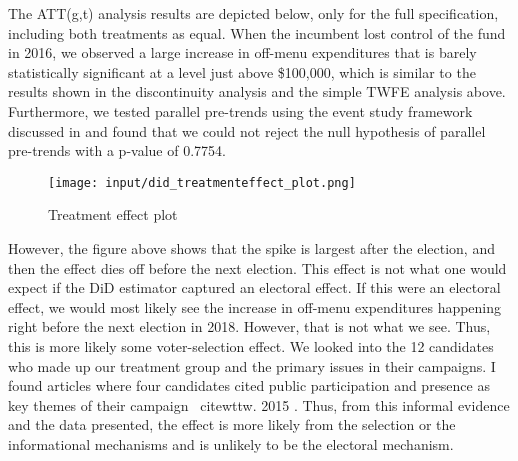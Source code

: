 The ATT(g,t) analysis results are depicted below, only for the full specification, including both treatments as equal. 
When the incumbent lost control of the fund in 2016, we observed a large increase in off-menu expenditures that is barely statistically significant at a level just above \$100,000, which is similar to the results shown in the discontinuity analysis and the simple TWFE analysis above. 
Furthermore, we tested parallel pre-trends using the event study framework discussed in \cite{CALLAWAY2021200} and found that we could not reject the null hypothesis of parallel pre-trends with a p-value of 0.7754. 

\begin{figure}[H]
    \centering
    \texttt{[image: input/did\_treatmenteffect\_plot.png]}
    \caption{Treatment effect plot}
\end{figure}


However, the figure above shows that the spike is largest after the election, and then the effect dies off before the next election. This effect is not what one would expect if the DiD estimator captured an electoral effect. 
If this were an electoral effect, we would most likely see the increase in off-menu expenditures happening right before the next election in 2018. However, that is not what we see. 
Thus, this is more likely some voter-selection effect. 
We looked into the 12 candidates who made up our treatment group and the primary issues in their campaigns. 
I found articles where four candidates cited public participation and presence as key themes of their campaign \, cite{wttw. 2015} \cite{dna.2015_18} \cite{dna.2015_35} \cite{dna.2015_7}. 
Thus, from this informal evidence and the data presented, the effect is more likely from the selection or the informational mechanisms and is unlikely to be the electoral mechanism. 